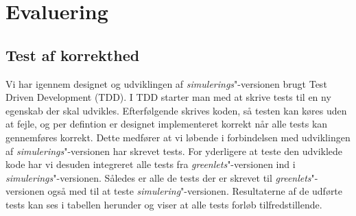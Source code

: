 \section{Evaluering}
\subsection{Test af korrekthed}
  Vi har igennem designet og udviklingen af \emph{simulerings}"-versionen brugt Test Driven Development (TDD). I TDD starter man med at skrive tests til en ny egenskab der skal udvikles. Efterfølgende skrives koden, så testen kan køres uden at fejle, og per defintion er designet implementeret korrekt når alle tests kan gennemføres korrekt. Dette medfører at vi løbende i forbindelsen med udviklingen af \emph{simulerings}"-versionen har skrevet tests. For yderligere at teste den udviklede kode har vi desuden integreret alle tests fra \emph{greenlets}"-versionen ind i \emph{simulerings}"-versionen. Således er alle de tests der er skrevet til \emph{greenlets}"-versionen også med til at teste \emph{simulering}"-versionen. Resultaterne af de udførte tests kan ses i tabellen herunder og viser at alle tests forløb tilfredstillende.
